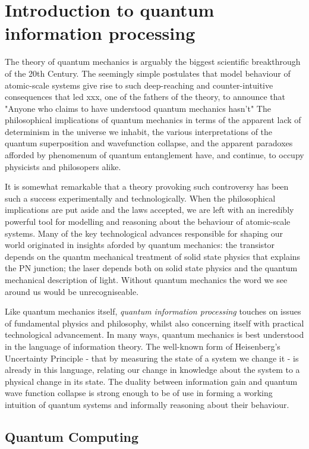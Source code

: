 \chapter{Introduction to quantum information processing} 
\label{ch:Introduction}

The theory of quantum mechanics is arguably the biggest scientific breakthrough of the 20th Century. The seemingly simple postulates that model behaviour of atomic-scale systems give rise to such deep-reaching and counter-intuitive consequences that led  xxx, one of the fathers of the theory, to announce that
"Anyone who claims to have understood quantum mechanics hasn't"
The philosophical implications of quantum mechanics in terms of the apparent lack of determinism in the universe we inhabit, the various interpretations of the quantum superposition and wavefunction collapse, and the apparent paradoxes afforded by phenomenum of quantum entanglement have, and continue, to occupy physicists and philosopers alike.

It is somewhat remarkable that a theory provoking such controversy has been such a success experimentally and technologically. When the philosophical implications are put aside and the laws accepted, we are left with an incredibly powerful tool for modelling and reasoning about the behaviour of atomic-scale systems. Many of the key technological advances responsible for shaping our world originated in insights aforded by quantum mechanics: the transistor depends on the quantm mechanical treatment of solid state physics that explains the PN junction; the laser depends both on solid state physics and the quantum mechanical description of light. Without quantum mechanics the word we see around us would be unrecogniseable.

Like quantum mechanics itself, \textit{quantum information processing} touches on issues of fundamental physics and philosophy, whilst also concerning itself with practical technological advancement. In many ways, quantum mechanics is best understood in the language of information theory. The well-known form of Heisenberg's Uncertainty Principle - that by measuring the state of a system we change it - is already in this language, relating our change in knowledge about the system to a physical change in its state. The duality between information gain and quantum wave function collapse is strong enough to be of use in forming a working intuition of quantum systems and informally reasoning about their behaviour.

\section{Quantum Computing}

